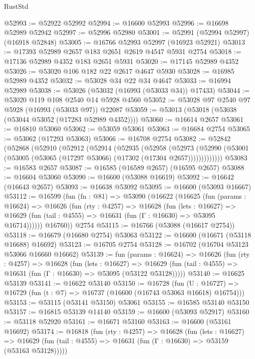 \begin{lexlean}{RustStd}
\begin{coremodule}
@52993 := @52922 @52992
@52994 := @16600 @52993
@52996 := @16698 @52989 @52942
@52997 := @52996 @52980
@53001 := @52991 (@52994 @52997) (@16918 @52848)
@53005 := @16766 @52993 @52997 (@16923 @52921)
@53013 := @17393 @52989 @2657 @183 @2651 @2619 @4547 @5931 @2754
@53018 := @17136 @52989 @4352 @183 @2651 @5931
@53020 := @17145 @52989 @4352
@53026 := @53020 @106 @182 @22 @2617 @4647 @5930
@53028 := @16985 @52989 @4352
@53032 := @53028 @34 @22 @34 @4647
@53033 := @16994 @52989
@53038 := @53026 (@53032 (@16993 (@53033 @34)) @17433)
@53044 := @53020 @119 @108 @2540 @14 @5928 @4560
@53052 := @53028 @97 @2540 @97 @5928 (@16993 (@53033 @97)) @22087
@53059 := @53013 (@53018 (@53038 (@53044 @53052 (@17283 @52989 @4352))))
@53060 := @16614 @2657
@53061 := @16810 @53060
@53062 := @53059 @53061
@53063 := @16684 @2754
@53065 := @53062 (@17293 @53063)
@53066 := @16708 @2754
@53082 := @52842
    (@52868
      (@52910
        (@52912
          (@52914
            (@52935
              (@52958
                (@52973
                  (@52990 (@53001 (@53005 (@53065 (@17297 @53066) (@17302 (@17304 @2657)))))))))))))
@53083 := @16583 @2657
@53087 := @16585 (@16589 @2657) (@16595 @2657)
@53088 := @16604 @53060
@53090 := @16600 (@53088 @16619)
@53092 := @16642 (@16643 @2657)
@53093 := @16638 @53092
@53095 := @16600 (@53093 @16667)
@53112 := @16599
    (fun (fn : @81) =>
    @53090
      (@16622
        (@16625
          (fun (params : @16624) =>
          @16626
            (fun (rty : @4257) =>
            @16628
              (fun (lets : @16627) =>
              @16629 (fun (tail : @4555) => @16631 (fun (Γ : @16630) => @53095 @16714))))))
        @16760))
    @2754
@53115 := @16766 (@53088 (@16617 @2754))
@53118 := @16679 (@16680 @2754) @53063
@53122 := @16600 (@16671 (@53118 @16688) @16692)
@53123 := @16705 @2754
@53128 := @16702 (@16704 @53123 @53066 @16660 @16662)
@53139 := fun (params : @16624) =>
  @16626
    (fun (rty : @4257) =>
    @16628
      (fun (lets : @16627) =>
      @16629 (fun (tail : @4555) => @16631 (fun (Γ : @16630) => @53095 (@53122 @53128)))))
@53140 := @16625 @53139
@53141 := @16622 @53140
@53150 := @16728
    (fun (U : @16727) => @16729 (fun (t : @7) => @16737 (@16600 (@16743 @53063 @16618) @16754)))
@53153 := @53115 (@53141 @53150) @53061
@53155 := @16585 @53140 @53150
@53157 := @16815 @53139 @14140
@53159 := @16600 (@53093 @52917)
@53160 := @53118 @52920
@53161 := @16671 @53160
@53163 := @16600 (@53161 @16692)
@53174 := @16818
    (fun (rty : @4257) =>
    @16628
      (fun (lets : @16627) =>
      @16629 (fun (tail : @4555) => @16631 (fun (Γ : @16630) => @53159 (@53163 @53128)))))

\end{coremodule}
\end{lexlean}
